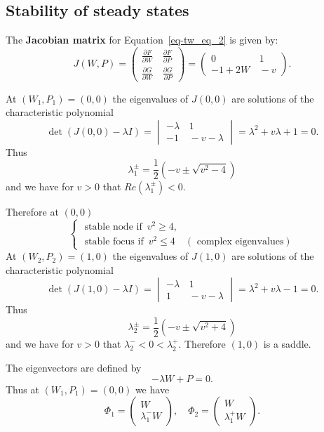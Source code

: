 \documentclass[
  letterpaper,
  DIV=11,
  numbers=noendperiod]{scrreprt}
\theoremstyle{plain}
\theoremstyle{definition}
\theoremstyle{plain}
\theoremstyle{remark}
\begin{document}
\hypertarget{stability-of-steady-states}{%
\subsection{Stability of steady
states}\label{stability-of-steady-states}}

The \textbf{Jacobian matrix} for Equation~\ref{eq-tw_eq_2} is given by:
\[
J(W,P) = \begin{pmatrix}
\frac{\partial F}{\partial W} & \, \frac{\partial F }{\partial P}\\
\frac{\partial G }{\partial W} & \, \frac{\partial G }{\partial P}
\end{pmatrix}  =
\begin{pmatrix}
0 & \,  1\\
-1 + 2W & \, - v 
\end{pmatrix}.
\]

At \((W_1, P_1)=(0,0)\) the eigenvalues of \(J(0,0)\) are solutions of
the characteristic polynomial \[
\det(J(0,0) - \lambda I) = \begin{vmatrix} -\lambda & \, 1\\
- 1 & \, -v - \lambda
\end{vmatrix} = \lambda^2 + v \lambda + 1 = 0.
\] Thus \[
\lambda^{\pm}_1 = \frac 12 ( - v \pm \sqrt{ v^2 - 4})
\] and we have for \(v>0\) that \({R} e(\lambda_1^\pm) <0\).

Therefore at \((0, 0)\) \[
\begin{cases} 
\text{ stable node if }\,   v^2 \geq 4, \\
\text{ stable focus if } \,  v^2 \leq 4 \quad (\text{ complex eigenvalues})
\end{cases}
\] At \((W_2, P_2)=(1,0)\) the eigenvalues of \(J(1,0)\) are solutions
of the characteristic polynomial \[
\det(J(1,0) - \lambda I) = \begin{vmatrix} -\lambda & \, 1 \\
1 & \, -v - \lambda
\end{vmatrix} = \lambda^2 + v \lambda - 1 = 0.
\] Thus \[
\lambda^{\pm}_2 = \frac 12 ( - v \pm \sqrt{ v^2 + 4})
\] and we have for \(v>0\) that \(\lambda_2^{-} <0 < \lambda_2^+\).
Therefore \((1,0)\) is a saddle.

The eigenvectors are defined by \[
- \lambda W + P = 0.
\] Thus at \((W_1, P_1)=(0,0)\) we have \[
\Phi_1 = \begin{pmatrix}
W\\
\lambda_1^- W
\end{pmatrix}, \quad  \Phi_2 = \begin{pmatrix}
W\\
\lambda_1^+ W
\end{pmatrix}. 
\]
\end{document}
